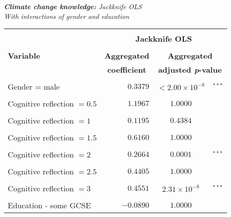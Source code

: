 \documentclass[a4paper,12pt]{article}
\begin{document}
{\centering
\begin{threeparttable}
\caption{\textit{\textbf{Climate change knowledge:} Jackknife OLS \\ With interactions of gender and education}}
\label{Know4235f} 
\centering
\begin{small}
\begin{tabular}{lrcl} 
\hline \vspace{-0.2cm} \\
  \multicolumn{1}{l}{} & \multicolumn{3}{c}{\large{\textbf{Jackknife OLS}}}  \\
  
\vspace{-0.2cm} \\
  \multicolumn{1}{l}{\vspace{0.1cm}\textbf{Variable}} & \multicolumn{1}{l}{\textbf{Aggregated}} &  \multicolumn{2}{c}{\textbf{Aggregated}} \\
   \multicolumn{1}{l}{ } &  \multicolumn{1}{c}{\textbf{coefficient}} &  \multicolumn{2}{c}{\textbf{adjusted \textit{p}-value}} \\
 \hline 
\hline
\\
\vspace{-0.2cm}Gender = male&$0.3379$&$<2.00\times 10^{-8}$&$^{***}$\\
  \\
\vspace{-0.2cm}Cognitive reflection $=0.5$&$1.1967$&$1.0000$&\\
  \\
\vspace{-0.2cm}Cognitive reflection $=1$&$0.1195$&$0.4384$& \\
  \\
\vspace{-0.2cm}Cognitive reflection $=1.5$&$0.6160$&$1.0000$ \\
  \\
\vspace{-0.2cm}Cognitive reflection $=2$&$0.2664$&$0.0001$&$^{***}$\\
  \\
\vspace{-0.2cm}Cognitive reflection $=2.5$&$0.4405$&$1.0000$&\\
  \\
  \vspace{-0.2cm}Cognitive reflection $=3$&$0.4551$&$2.31\times 10^{-8}$&$^{***}$\\
\\
  \vspace{-0.2cm}Education - some GCSE&$-0.0890$&$1.0000$&\\

\end{tabular}
\end{small}
\end{threeparttable}}
\end{document}
